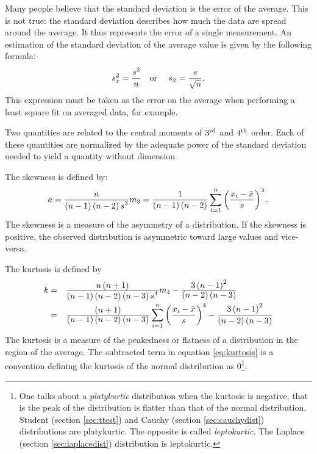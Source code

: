 \documentclass[twoside]{book}
\begin{document}
Many people believe that the standard deviation is the error of
the average. This is not true: the standard deviation describes
how much the data are spread around the average. It thus
represents the error of a single measurement. An estimation of the
standard deviation of the average value is given by the following
formula:
\begin{equation}
\label{eq:averagerror}
  s_{\bar{x}}^2={\displaystyle s^2 \over n}
  \mbox{\quad or \quad}
  s_{\bar{x}}={\displaystyle s \over \sqrt{n}}.
\end{equation}
This expression must be taken as the error on the average when
performing a least square fit on averaged data, for example.

Two quantities are related to the central moments of $3^{\mathop{\rm rd}}$
and $4^{\mathop{\rm th}}$ order. Each of these quantities are normalized by the
adequate power of the standard deviation needed to yield a
quantity without dimension.

\noindent The skewness is defined by:
\begin{equation}
  a={\displaystyle n \over\displaystyle
  \left(n-1\right)\left(n-2\right)s^3}m_3
  ={\displaystyle 1 \over\displaystyle
  \left(n-1\right)\left(n-2\right)}
  \sum_{i=1}^n\left({\displaystyle x_i-\bar{x}\over\displaystyle s}\right)^3.
\end{equation}
The skewness is a measure of the asymmetry of a distribution. If
the skewness is positive, the observed distribution is asymmetric
toward large values and vice-versa.

\noindent The kurtosis is defined by
\begin{equation}
\label{eq:kurtosis}
  \begin{array}{rl}
    k=& {\displaystyle n\left(n+1\right) \over\displaystyle
  \left(n-1\right)\left(n-2\right)\left(n-3\right)s^4}m_4 -{\displaystyle 3\left(n-1\right)^2 \over\displaystyle
  \left(n-2\right)\left(n-3\right)}\\*[2ex]
    =& {\displaystyle \left(n+1\right) \over\displaystyle
  \left(n-1\right)\left(n-2\right)\left(n-3\right)}
  \displaystyle\sum_{i=1}^n\left({\displaystyle x_i-\bar{x}\over\displaystyle s}\right)^4 -{\displaystyle 3\left(n-1\right)^2 \over\displaystyle
  \left(n-2\right)\left(n-3\right)}
  \end{array}
\end{equation}
The kurtosis is a measure of the peakedness or flatness of a
distribution in the region of the average. The subtracted term in
equation \ref{eq:kurtosis} is a convention defining the kurtosis
of the normal distribution as 0\footnote{One talks about a {\sl
platykurtic} distribution when the kurtosis is negative, that is
the peak of the distribution is flatter than that of the normal
distribution. Student (\cf section \ref{sec:ttest}) and Cauchy
(\cf section \ref{sec:cauchydist}) distributions are platykurtic.
The opposite is called {\sl leptokurtic}. The Laplace (\cf section
\ref{sec:laplacedist}) distribution is leptokurtic. }.
\end{document}
